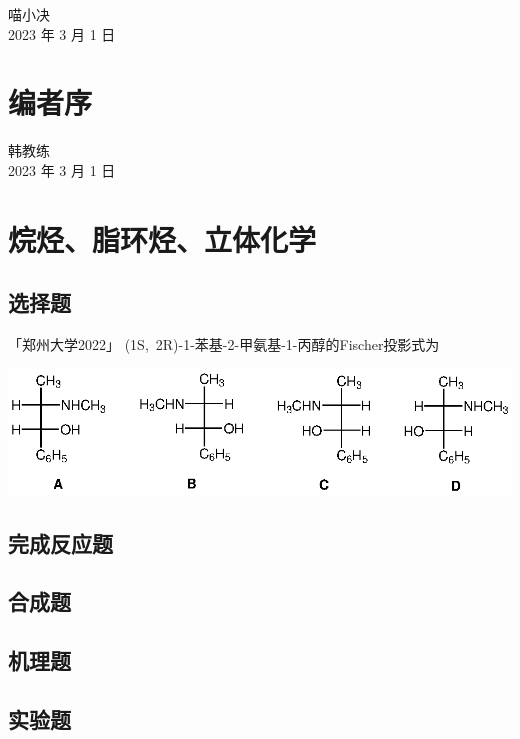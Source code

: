\documentclass[
  10pt,
  twoside,
  openany,
  b5paper, %
  colorscheme = basic, %
]{qyxf-book}
\begin{document}
\begin{flushright}
	喵小决\\
	2023 年 3 月 1 日
\end{flushright}

\chapter*{编者序}



\begin{flushright}
	韩教练\\
	2023 年 3 月 1 日
\end{flushright}

\cleardoublepage


\tableofcontents

\chapter{烷烃、脂环烃、立体化学}

\section{选择题}

 「郑州大学2022」 (1S,\ 2R)-1-苯基-2-甲氨基-1-丙醇的Fischer投影式为
\begin{scheme}[ht]
	\includegraphics{chapter1/01/001.eps}
\end{scheme}

\section{完成反应题}
\section{合成题}
\section{机理题}
\section{实验题}
\end{document}

